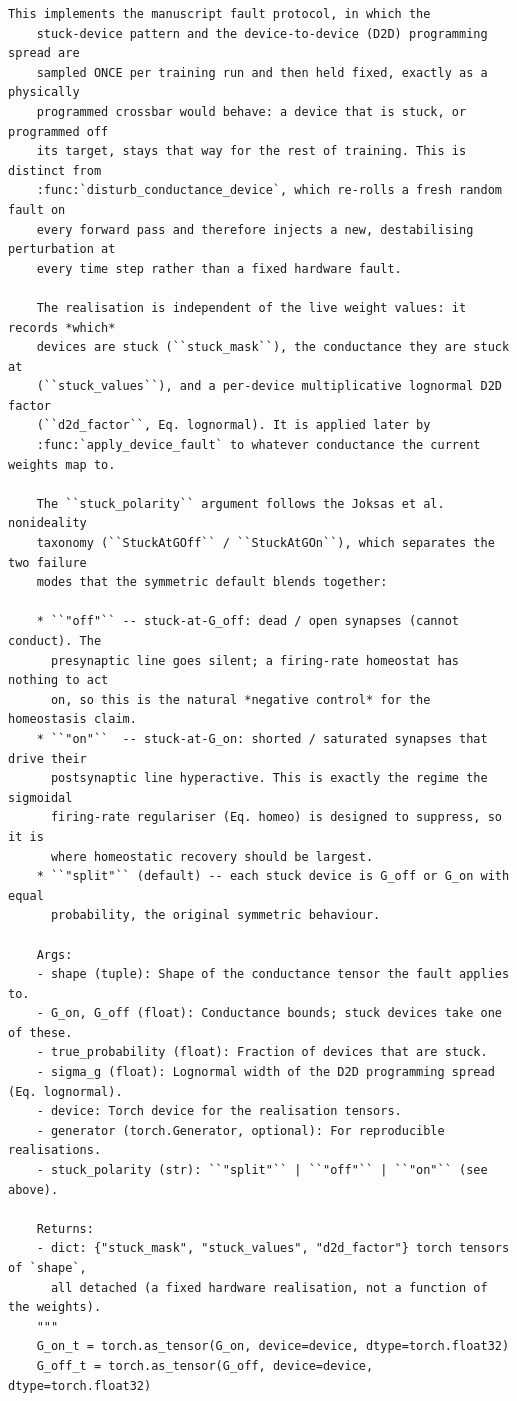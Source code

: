 \begin{lstlisting}[caption={mnn\_torch/effects.py},label={lst:mnn-src-effects}]
    This implements the manuscript fault protocol, in which the
    stuck-device pattern and the device-to-device (D2D) programming spread are
    sampled ONCE per training run and then held fixed, exactly as a physically
    programmed crossbar would behave: a device that is stuck, or programmed off
    its target, stays that way for the rest of training. This is distinct from
    :func:`disturb_conductance_device`, which re-rolls a fresh random fault on
    every forward pass and therefore injects a new, destabilising perturbation at
    every time step rather than a fixed hardware fault.

    The realisation is independent of the live weight values: it records *which*
    devices are stuck (``stuck_mask``), the conductance they are stuck at
    (``stuck_values``), and a per-device multiplicative lognormal D2D factor
    (``d2d_factor``, Eq. lognormal). It is applied later by
    :func:`apply_device_fault` to whatever conductance the current weights map to.

    The ``stuck_polarity`` argument follows the Joksas et al. nonideality
    taxonomy (``StuckAtGOff`` / ``StuckAtGOn``), which separates the two failure
    modes that the symmetric default blends together:

    * ``"off"`` -- stuck-at-G_off: dead / open synapses (cannot conduct). The
      presynaptic line goes silent; a firing-rate homeostat has nothing to act
      on, so this is the natural *negative control* for the homeostasis claim.
    * ``"on"``  -- stuck-at-G_on: shorted / saturated synapses that drive their
      postsynaptic line hyperactive. This is exactly the regime the sigmoidal
      firing-rate regulariser (Eq. homeo) is designed to suppress, so it is
      where homeostatic recovery should be largest.
    * ``"split"`` (default) -- each stuck device is G_off or G_on with equal
      probability, the original symmetric behaviour.

    Args:
    - shape (tuple): Shape of the conductance tensor the fault applies to.
    - G_on, G_off (float): Conductance bounds; stuck devices take one of these.
    - true_probability (float): Fraction of devices that are stuck.
    - sigma_g (float): Lognormal width of the D2D programming spread (Eq. lognormal).
    - device: Torch device for the realisation tensors.
    - generator (torch.Generator, optional): For reproducible realisations.
    - stuck_polarity (str): ``"split"`` | ``"off"`` | ``"on"`` (see above).

    Returns:
    - dict: {"stuck_mask", "stuck_values", "d2d_factor"} torch tensors of `shape`,
      all detached (a fixed hardware realisation, not a function of the weights).
    """
    G_on_t = torch.as_tensor(G_on, device=device, dtype=torch.float32)
    G_off_t = torch.as_tensor(G_off, device=device, dtype=torch.float32)


\end{lstlisting}
